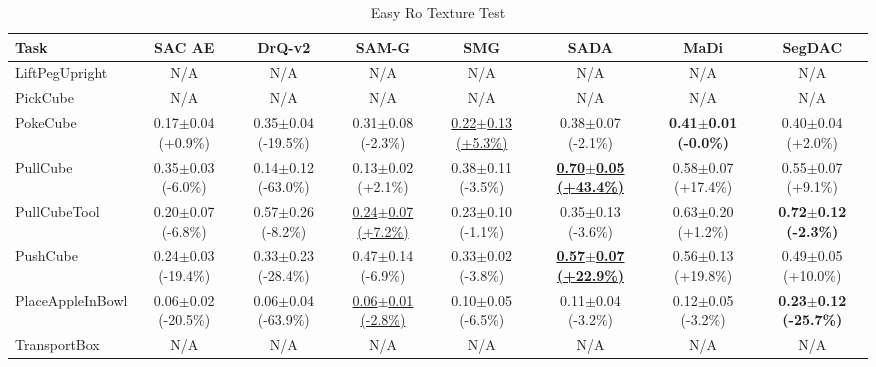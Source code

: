 \begin{table}[htbp]
\centering
\scriptsize
\caption{Easy Ro Texture Test}
\label{tab:appendix_rotexturetest_easy}
\begin{adjustbox}{max width=\textwidth}
\begin{tabular}{l*{7}{c}}
\toprule
\textbf{Task} & \textbf{SAC AE} & \textbf{DrQ-v2} & \textbf{SAM-G} & \textbf{SMG} & \textbf{SADA} & \textbf{MaDi} & \textbf{SegDAC} \\
\midrule
LiftPegUpright & N/A & N/A & N/A & N/A & N/A & N/A & N/A \\
PickCube & N/A & N/A & N/A & N/A & N/A & N/A & N/A \\
PokeCube & 0.17$\pm$0.04 \scriptsize{(+0.9\%)} & 0.35$\pm$0.04 \scriptsize{(-19.5\%)} & 0.31$\pm$0.08 \scriptsize{(-2.3\%)} & \underline{0.22$\pm$0.13 \scriptsize{(+5.3\%)}} & 0.38$\pm$0.07 \scriptsize{(-2.1\%)} & \textbf{0.41$\pm$0.01 \scriptsize{(-0.0\%)}} & 0.40$\pm$0.04 \scriptsize{(+2.0\%)} \\
PullCube & 0.35$\pm$0.03 \scriptsize{(-6.0\%)} & 0.14$\pm$0.12 \scriptsize{(-63.0\%)} & 0.13$\pm$0.02 \scriptsize{(+2.1\%)} & 0.38$\pm$0.11 \scriptsize{(-3.5\%)} & \textbf{\underline{0.70$\pm$0.05 \scriptsize{(+43.4\%)}}} & 0.58$\pm$0.07 \scriptsize{(+17.4\%)} & 0.55$\pm$0.07 \scriptsize{(+9.1\%)} \\
PullCubeTool & 0.20$\pm$0.07 \scriptsize{(-6.8\%)} & 0.57$\pm$0.26 \scriptsize{(-8.2\%)} & \underline{0.24$\pm$0.07 \scriptsize{(+7.2\%)}} & 0.23$\pm$0.10 \scriptsize{(-1.1\%)} & 0.35$\pm$0.13 \scriptsize{(-3.6\%)} & 0.63$\pm$0.20 \scriptsize{(+1.2\%)} & \textbf{0.72$\pm$0.12 \scriptsize{(-2.3\%)}} \\
PushCube & 0.24$\pm$0.03 \scriptsize{(-19.4\%)} & 0.33$\pm$0.23 \scriptsize{(-28.4\%)} & 0.47$\pm$0.14 \scriptsize{(-6.9\%)} & 0.33$\pm$0.02 \scriptsize{(-3.8\%)} & \textbf{\underline{0.57$\pm$0.07 \scriptsize{(+22.9\%)}}} & 0.56$\pm$0.13 \scriptsize{(+19.8\%)} & 0.49$\pm$0.05 \scriptsize{(+10.0\%)} \\
PlaceAppleInBowl & 0.06$\pm$0.02 \scriptsize{(-20.5\%)} & 0.06$\pm$0.04 \scriptsize{(-63.9\%)} & \underline{0.06$\pm$0.01 \scriptsize{(-2.8\%)}} & 0.10$\pm$0.05 \scriptsize{(-6.5\%)} & 0.11$\pm$0.04 \scriptsize{(-3.2\%)} & 0.12$\pm$0.05 \scriptsize{(-3.2\%)} & \textbf{0.23$\pm$0.12 \scriptsize{(-25.7\%)}} \\
TransportBox & N/A & N/A & N/A & N/A & N/A & N/A & N/A \\
\bottomrule
\end{tabular}
\end{adjustbox}
\end{table}

